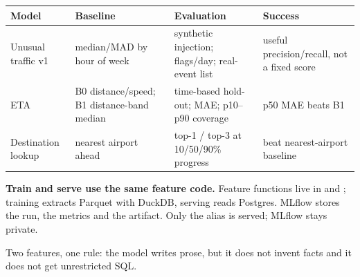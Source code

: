 \documentclass[10.5pt]{article}
\begin{document}
\begin{tabularx}{\linewidth}{@{}p{3.0cm} p{4.0cm} p{4.0cm} X@{}}
\toprule
\textbf{Model} & \textbf{Baseline} & \textbf{Evaluation} & \textbf{Success} \\
\midrule
Unusual traffic v1 & median/MAD by hour of week & synthetic injection; flags/day; real-event list & useful precision/recall, not a fixed score \\
ETA & B0 distance/speed; B1 distance-band median & time-based hold-out; MAE; p10–p90 coverage & p50 MAE beats B1 \\
Destination lookup & nearest airport ahead & top-1 / top-3 at 10/50/90\% progress & beat nearest-airport baseline \\
\bottomrule
\end{tabularx}

\begin{softcard}
{\bfseries Train and serve use the same feature code.} Feature functions live in  and ; training extracts Parquet with DuckDB, serving reads Postgres. MLflow stores the run, the metrics and the artifact. Only the  alias is served; MLflow stays private.
\end{softcard}

\newpage
{}

{\small
Two features, one rule: the model writes prose, but it does not invent facts and it does not get unrestricted SQL.
}
\end{document}
